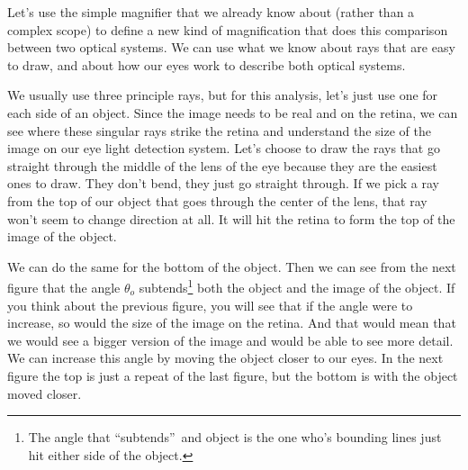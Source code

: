 \documentclass{article}
\begin{document}
Let's use the simple magnifier that we already know about (rather than a
complex scope) to define a new kind of magnification that does this
comparison between two optical systems. We can use what we know about rays
that are easy to draw, and about how our eyes work to describe both optical
systems.

We usually use three principle rays, but for this analysis, let's just use
one for each side of an object. Since the image needs to be real and on the
retina, we can see where these singular rays strike the retina and
understand the size of the image on our eye light detection system. Let's
choose to draw the rays that go straight through the middle of the lens of
the eye because they are the easiest ones to draw. They don't bend, they
just go straight through. If we pick a ray from the top of our object that
goes through the center of the lens, that ray won't seem to change direction
at all. It will hit the retina to form the top of the image of the object.

We can do the same for the bottom of the object. Then we can see from the
next figure that the angle $\theta _{o}$ subtends\footnote{%
The angle that \textquotedblleft subtends\textquotedblright\ and object is
the one who's bounding lines just hit either side of the object.} both the
object and the image of the object. If you think about the previous figure,
you will see that if the angle were to increase, so would the size of the
image on the retina. And that would mean that we would see a bigger version
of the image and would be able to see more detail. We can increase this
angle by moving the object closer to our eyes. In the next figure the top is
just a repeat of the last figure, but the bottom is with the object moved
closer.
\end{document}
